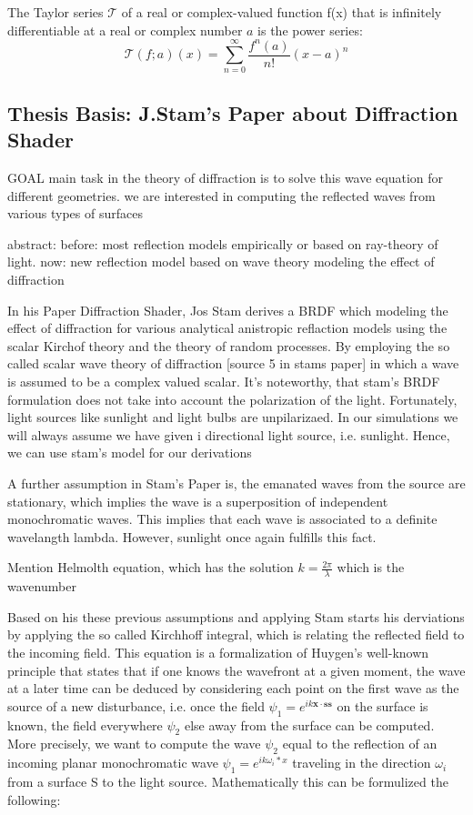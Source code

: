 The Taylor series $\mathcal T$ of a real or complex-valued function ƒ(x) that is infinitely differentiable at a real or complex number $a$ is the power series:
\begin{equation}
  \mathcal T(f;a)(x) = \sum_{n=0}^{\infty} \frac{f^{n}(a)}{n!}(x-a)^n
\end{equation}


\subsection{Thesis Basis: J.Stam's Paper about Diffraction Shader}
GOAL
main task in the theory of diffraction is to solve this wave equation for different geometries.
we are interested in computing the reflected waves from various types of surfaces

abstract:
before: most reflection models empirically or based on ray-theory of light.
now: new reflection model based on wave theory modeling the effect of diffraction


In his Paper Diffraction Shader, Jos Stam derives a BRDF which modeling the effect of diffraction for various analytical anistropic reflaction models using the scalar Kirchof theory and the theory of random processes. By employing the so called scalar wave theory of diffraction [source 5 in stams paper] in which a wave is assumed to be a complex valued scalar. It's noteworthy, that stam's BRDF formulation does not take into account the polarization of the light. Fortunately, light sources like sunlight and light bulbs are unpilarizaed. In our simulations we will always assume we have given i directional light source, i.e. sunlight. Hence, we can use stam's model for our derivations

A further assumption in Stam's Paper is, the emanated waves from the source are stationary, which implies the wave is a superposition of independent monochromatic waves. This implies that each wave is associated to a definite wavelangth lambda. However, sunlight once again fulfills this fact.

Mention Helmolth equation, which has the solution $k = \frac{2\pi}{\lambda}$ which is the wavenumber

Based on his these previous assumptions and applying Stam starts his derviations by applying the so called Kirchhoff integral, which is relating the reflected field to the incoming field. This equation is a formalization of Huygen’s well-known principle that states that if one knows the wavefront at a given moment, the wave at a later time can be deduced by considering each point on the first wave as the source of a new disturbance, i.e. once the field  $\psi_1 =  e^{ik\mathbf{x} \cdot \mathbf{s}\mathbf{s}}$ on the surface is known, the field everywhere $\psi_2$ else away from the surface can be computed.
More precisely, we want to compute the wave $\psi_2$ equal to the reflection of an incoming planar monochromatic wave $\psi_1 = e^{ik \omega_i * x}$  traveling in the direction $\omega_i$ from a surface S to the light source. Mathematically this can be formulized the following:


